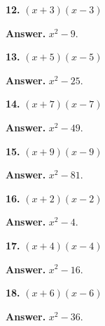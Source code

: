 \documentclass{ximera}
\begin{document}
\begin{problem}

\textbf{12.} $(x+3)(x-3)$

\begin{hint}
\textbf{Answer.} $x^{2} - 9$.
\end{hint}
\end{problem}

\begin{problem}

\textbf{13.} $(x+5)(x-5)$

\begin{hint}
\textbf{Answer.} $x^{2} - 25$.
\end{hint}
\end{problem}

\begin{problem}

\textbf{14.} $(x+7)(x-7)$

\begin{hint}
\textbf{Answer.} $x^{2} - 49$.
\end{hint}
\end{problem}

\begin{problem}

\textbf{15.} $(x+9)(x-9)$

\begin{hint}
\textbf{Answer.} $x^{2} - 81$.
\end{hint}
\end{problem}

\begin{problem}

\textbf{16.} $(x+2)(x-2)$

\begin{hint}
\textbf{Answer.} $x^{2} - 4$.
\end{hint}
\end{problem}

\begin{problem}

\textbf{17.} $(x+4)(x-4)$

\begin{hint}
\textbf{Answer.} $x^{2} - 16$.
\end{hint}
\end{problem}

\begin{problem}

\textbf{18.} $(x+6)(x-6)$

\begin{hint}
\textbf{Answer.} $x^{2} - 36$.
\end{hint}
\end{problem}
\end{document}
